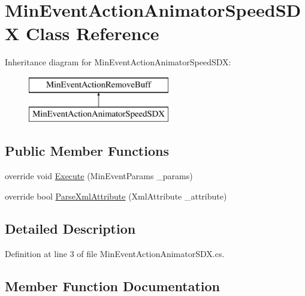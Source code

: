 \hypertarget{class_min_event_action_animator_speed_s_d_x}{}\section{Min\+Event\+Action\+Animator\+Speed\+S\+DX Class Reference}
\label{class_min_event_action_animator_speed_s_d_x}
Inheritance diagram for Min\+Event\+Action\+Animator\+Speed\+S\+DX\+:\begin{figure}[H]
\begin{center}
\leavevmode
\includegraphics[height=2.000000cm]{class_min_event_action_animator_speed_s_d_x}
\end{center}
\end{figure}
\subsection*{Public Member Functions}
\begin{DoxyCompactItemize}
\item 
override void \mbox{\hyperlink{class_min_event_action_animator_speed_s_d_x_af54acaa18227f6bf40208447b64922db}{Execute}} (Min\+Event\+Params \+\_\+params)
\item 
override bool \mbox{\hyperlink{class_min_event_action_animator_speed_s_d_x_aab4050a4d0a53fa0539594f9713ea74d}{Parse\+Xml\+Attribute}} (Xml\+Attribute \+\_\+attribute)
\end{DoxyCompactItemize}


\subsection{Detailed Description}


Definition at line 3 of file Min\+Event\+Action\+Animator\+S\+D\+X.\+cs.



\subsection{Member Function Documentation}
\mbox{\label{class_min_event_action_animator_speed_s_d_x_af54acaa18227f6bf40208447b64922db}} 
